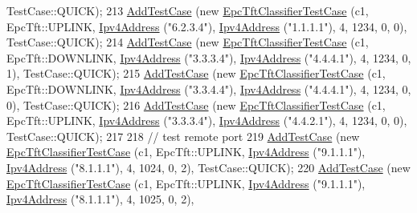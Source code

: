 \begin{DoxyCode}
      TestCase::QUICK);
213   \hyperlink{classns3_1_1TestCase_a3718088e3eefd5d6454569d2e0ddd835}{AddTestCase} (\textcolor{keyword}{new} \hyperlink{classEpcTftClassifierTestCase}{EpcTftClassifierTestCase} (c1, EpcTft::UPLINK,   
      \hyperlink{classns3_1_1Ipv4Address}{Ipv4Address} (\textcolor{stringliteral}{"6.2.3.4"}), \hyperlink{classns3_1_1Ipv4Address}{Ipv4Address} (\textcolor{stringliteral}{"1.1.1.1"}),     4,     1234,     0,    0), 
      TestCase::QUICK);
214   \hyperlink{classns3_1_1TestCase_a3718088e3eefd5d6454569d2e0ddd835}{AddTestCase} (\textcolor{keyword}{new} \hyperlink{classEpcTftClassifierTestCase}{EpcTftClassifierTestCase} (c1, EpcTft::DOWNLINK, 
      \hyperlink{classns3_1_1Ipv4Address}{Ipv4Address} (\textcolor{stringliteral}{"3.3.3.4"}), \hyperlink{classns3_1_1Ipv4Address}{Ipv4Address} (\textcolor{stringliteral}{"4.4.4.1"}),     4,     1234,     0,    1), 
      TestCase::QUICK);
215   \hyperlink{classns3_1_1TestCase_a3718088e3eefd5d6454569d2e0ddd835}{AddTestCase} (\textcolor{keyword}{new} \hyperlink{classEpcTftClassifierTestCase}{EpcTftClassifierTestCase} (c1, EpcTft::DOWNLINK, 
      \hyperlink{classns3_1_1Ipv4Address}{Ipv4Address} (\textcolor{stringliteral}{"3.3.4.4"}), \hyperlink{classns3_1_1Ipv4Address}{Ipv4Address} (\textcolor{stringliteral}{"4.4.4.1"}),     4,     1234,     0,    0), 
      TestCase::QUICK);
216   \hyperlink{classns3_1_1TestCase_a3718088e3eefd5d6454569d2e0ddd835}{AddTestCase} (\textcolor{keyword}{new} \hyperlink{classEpcTftClassifierTestCase}{EpcTftClassifierTestCase} (c1, EpcTft::UPLINK,   
      \hyperlink{classns3_1_1Ipv4Address}{Ipv4Address} (\textcolor{stringliteral}{"3.3.3.4"}), \hyperlink{classns3_1_1Ipv4Address}{Ipv4Address} (\textcolor{stringliteral}{"4.4.2.1"}),     4,     1234,     0,    0), 
      TestCase::QUICK);
217 
218   \textcolor{comment}{// test remote port}
219   \hyperlink{classns3_1_1TestCase_a3718088e3eefd5d6454569d2e0ddd835}{AddTestCase} (\textcolor{keyword}{new} \hyperlink{classEpcTftClassifierTestCase}{EpcTftClassifierTestCase} (c1, EpcTft::UPLINK,   
      \hyperlink{classns3_1_1Ipv4Address}{Ipv4Address} (\textcolor{stringliteral}{"9.1.1.1"}), \hyperlink{classns3_1_1Ipv4Address}{Ipv4Address} (\textcolor{stringliteral}{"8.1.1.1"}),     4,     1024,     0,    2), 
      TestCase::QUICK);
220   \hyperlink{classns3_1_1TestCase_a3718088e3eefd5d6454569d2e0ddd835}{AddTestCase} (\textcolor{keyword}{new} \hyperlink{classEpcTftClassifierTestCase}{EpcTftClassifierTestCase} (c1, EpcTft::UPLINK,   
      \hyperlink{classns3_1_1Ipv4Address}{Ipv4Address} (\textcolor{stringliteral}{"9.1.1.1"}), \hyperlink{classns3_1_1Ipv4Address}{Ipv4Address} (\textcolor{stringliteral}{"8.1.1.1"}),     4,     1025,     0,    2), 

\end{DoxyCode}
